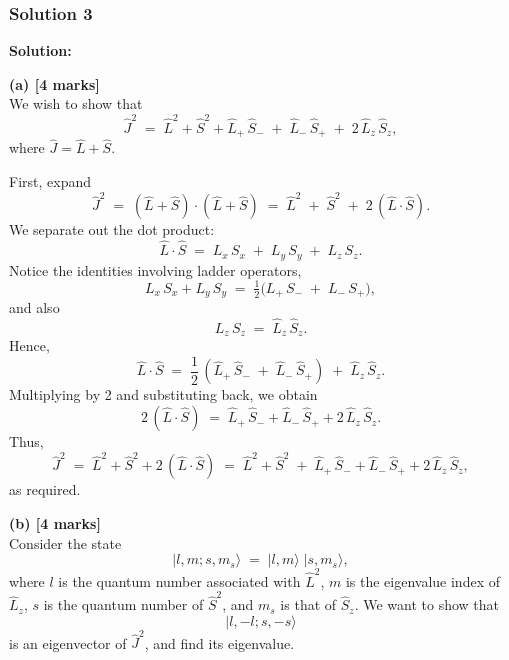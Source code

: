\documentclass{article}
\begin{document}
\bigskip


\subsubsection{Solution 3}

\noindent
\textbf{Solution:}

\bigskip

\textbf{(a) [4 marks]}\\
We wish to show that
\[
\hat{J}^2 \;=\; \hat{L}^2 + \hat{S}^2 + \hat{L}_+\,\hat{S}_- \;+\; \hat{L}_-\,\hat{S}_+ \;+\; 2\,\hat{L}_z\,\hat{S}_z,
\]
where \(\hat{J}=\hat{L}+\hat{S}\). 

First, expand
\[
\hat{J}^2 \;=\; (\hat{L} + \hat{S}) \cdot (\hat{L} + \hat{S}) 
\;=\; \hat{L}^2 \;+\; \hat{S}^2 \;+\; 2\,(\hat{L}\cdot \hat{S}).
\]
We separate out the dot product:
\[
\hat{L} \cdot \hat{S} \;=\; L_x\,S_x \;+\; L_y\,S_y \;+\; L_z\,S_z.
\]
Notice the identities involving ladder operators,
\[
L_x\,S_x + L_y\,S_y 
\;=\; \tfrac{1}{2}\bigl( L_+\,S_- \;+\; L_-\,S_+ \bigr),
\]
and also
\[
L_z\,S_z \;=\; \hat{L}_z\,\hat{S}_z.
\]
Hence,
\[
\hat{L}\cdot \hat{S} 
\;=\; \frac12\,(\hat{L}_+\,\hat{S}_- \;+\; \hat{L}_-\,\hat{S}_+) 
\;+\; \hat{L}_z\,\hat{S}_z.
\]
Multiplying by 2 and substituting back, we obtain
\[
2\,(\hat{L}\cdot \hat{S})
\;=\; \hat{L}_+\,\hat{S}_- + \hat{L}_-\,\hat{S}_+ + 2\,\hat{L}_z\,\hat{S}_z.
\]
Thus,
\[
\hat{J}^2 
\;=\; \hat{L}^2 + \hat{S}^2 + 2\,(\hat{L}\cdot\hat{S})
\;=\; \hat{L}^2 + \hat{S}^2 
\;+\; \hat{L}_+\,\hat{S}_- + \hat{L}_-\,\hat{S}_+ + 2\,\hat{L}_z\,\hat{S}_z,
\]
as required.

\bigskip

\textbf{(b) [4 marks]}\\
Consider the state
\[
|l,m;s,m_s\rangle \;=\; |l,m\rangle\;|s,m_s\rangle,
\]
where \(l\) is the quantum number associated with \(\hat{L}^2\), \(m\) is the eigenvalue index of \(\hat{L}_z\), \(s\) is the quantum number of \(\hat{S}^2\), and \(m_s\) is that of \(\hat{S}_z\). We want to show that 
\[
|l,-l; s,-s\rangle
\]
is an eigenvector of \(\hat{J}^2\), and find its eigenvalue.
\end{document}

